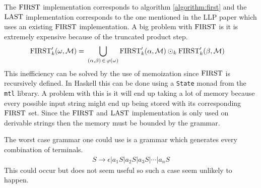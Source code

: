 The $\text{FIRST}$ implementation corresponds to algorithm \ref{algorithm:first} and the $\text{LAST}$ implementation corresponds to the one mentioned in the LLP paper \cite[12]{Vagner2007} which uses an existing $\text{FIRST}$ implementation. A big problem with $\text{FIRST}$ is it is extremely expensive because of the truncated product step.
\begin{align*}
    \text{FIRST}'_k(\omega, \mathcal{M}) =&\,\, \bigcup_{(\alpha, \beta) \, \in \, \varphi(\omega)} \text{FIRST}'_k(\alpha, \mathcal{M}) \odot_k \text{FIRST}'_k(\beta, \mathcal{M})
\end{align*}
This inefficiency can be solved by the use of memoization since $\text{FIRST}$ is recursively defined. In Haskell this can be done using a \lstinline{State} monad from the \lstinline{mtl} library. A problem with this is it will end up taking a lot of memory because every possible input string might end up being stored with its corresponding $\text{FIRST}$ set. Since the $\text{FIRST}$ and $\text{LAST}$ implementation is only used on derivable strings then the memory must be bounded by the grammar.

The worst case grammar one could use is a grammar which generates every combination of terminals.
\begin{align*}
    S \to \epsilon | a_1 S | a_2 S | a_3 S | \cdots | a_n S
\end{align*}
This could occur but does not seem useful so such a case seem unlikely to happen.